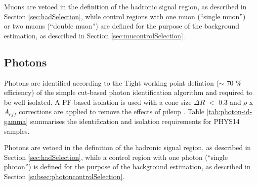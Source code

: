 
Muons are vetoed in the definition of the hadronic signal region, 
as described in Section \ref{sec:hadSelection}, while 
control regions with one muon (``single muon'') or two muons (``double muon'') are defined for the purpose of the background estimation, 
as described in Section \ref{sec:mucontrolSelection}.




\subsection{Photons}
\label{sec:photon-id}
Photons are identified according to the Tight working point defintion ($\sim$ 70 $\%$ efficiency) 
of the simple cut-based photon identification algorithm \cite{photon-id} 
and required to be well isolated. 
A PF-based isolation is used with a cone size $\Delta R$ $<$ 0.3 and $\rho$ x $A_{eff}$ corrections are applied to remove the effects of pileup \cite{pf-photon}. 
Table \ref{tab:photon-id-gamma} summarises the identification and isolation requirements for PHYS14 samples. 

Photons are vetoed in the definition of the hadronic signal region, 
as described in Section \ref{sec:hadSelection}, while a 
control region with one photon (``single photon'') is defined for the purpose of the background estimation, 
as described in Section \ref{subsec:photoncontrolSelection}.


